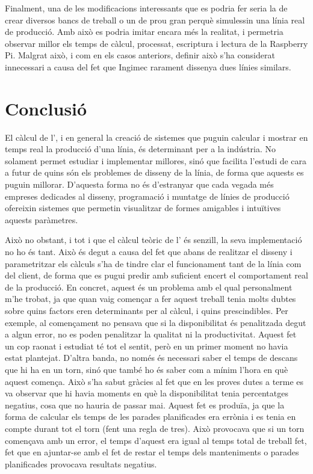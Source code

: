 \documentclass{tfgitic}[2022/06/30]
\begin{document}
Finalment, una de les modificacions interessants que es podria fer seria la de crear diversos bancs de treball o un de prou gran perquè simulessin una línia real de producció. Amb això es podria imitar encara més la realitat, i permetria observar millor els temps de càlcul, processat, escriptura i lectura de la Raspberry Pi. Malgrat això, i com en els casos anteriors, definir això s'ha considerat innecessari a causa del fet que Ingimec rarament dissenya dues línies similars.


\chapter{Conclusió}
\label{chapter:conclusion}
El càlcul de l', i en general la creació de sistemes que puguin calcular i mostrar en temps real la producció d'una línia, és determinant per a la indústria. No solament permet estudiar i implementar millores, sinó que facilita l'estudi de cara a futur de quins són els problemes de disseny de la línia, de forma que aquests es puguin millorar. D'aquesta forma no és d'estranyar que cada vegada més empreses dedicades al disseny, programació i muntatge de línies de producció ofereixin sistemes que permetin visualitzar de formes amigables i intuïtives aquests paràmetres.

Això no obstant, i tot i que el càlcul teòric de l' és senzill, la seva implementació no ho és tant. Això és degut a causa del fet que abans de realitzar el disseny i parametritzar els càlculs s'ha de tindre clar el funcionament tant de la línia com del client, de forma que es pugui predir amb suficient encert el comportament real de la producció. En concret, aquest és un problema amb el qual personalment m'he trobat, ja que quan vaig començar a fer aquest treball tenia molts dubtes sobre quins factors eren determinants per al càlcul, i quins prescindibles. Per exemple, al començament no pensava que si la disponibilitat és penalitzada degut a algun error, no es poden penalitzar la qualitat ni la productivitat. Aquest fet un cop raonat i estudiat té tot el sentit, però en un primer moment no havia estat plantejat. D'altra banda, no només és necessari saber el temps de descans que hi ha en un torn, sinó que també ho és saber com a mínim l'hora en què aquest comença. Això s'ha sabut gràcies al fet que en les proves dutes a terme es va observar que hi havia moments en què la disponibilitat tenia percentatges negatius, cosa que no hauria de passar mai. Aquest fet es produïa, ja que la forma de calcular els temps de les parades planificades era errònia i es tenia en compte durant tot el torn (fent una regla de tres). Això provocava que si un torn començava amb un error, el temps d'aquest era igual al temps total de treball fet, fet que en ajuntar-se amb el fet de restar el temps dels manteniments o parades planificades provocava resultats negatius.
\end{document}

